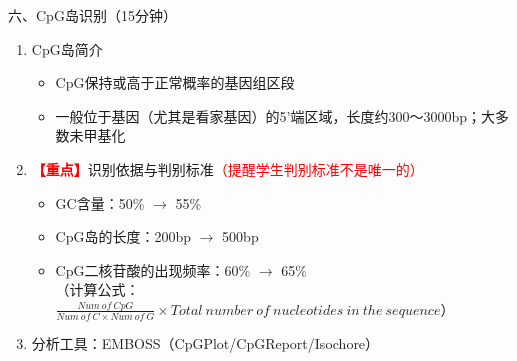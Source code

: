 \documentclass{TIJMUjiaoanLL}
\begin{document}
\otherTail
\newpage
\otherHeader


\noindent
六、CpG岛识别（15分钟）
\begin{enumerate}
  \item CpG岛简介
    \begin{itemize}
      \item CpG保持或高于正常概率的基因组区段
      \item 一般位于基因（尤其是看家基因）的5'端区域，长度约300～3000bp；大多数未甲基化
    \end{itemize}
  \item \textcolor{red}{\textbf{【重点】}}识别依据与判别标准\textcolor{red}{（提醒学生判别标准不是唯一的）}
    \begin{itemize}
      \item GC含量：50\% $\rightarrow$ 55\%
      \item CpG岛的长度：200bp $\rightarrow$ 500bp
      \item CpG二核苷酸的出现频率：60\% $\rightarrow$ 65\%\\
	（计算公式：$\frac{Num\ of\ CpG}{Num\ of\ C \times Num\ of\ G} \times Total\ number\ of\ nucleotides\ in\ the\ sequence$）
    \end{itemize}
  \item 分析工具：EMBOSS（CpGPlot/CpGReport/Isochore）
\end{enumerate}
\end{document}
